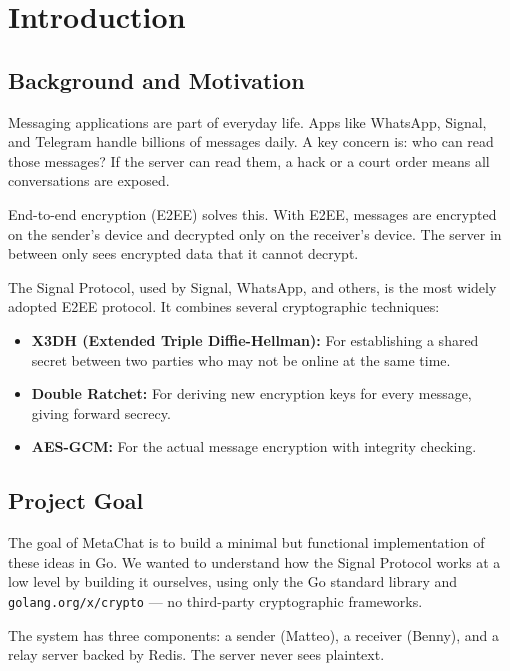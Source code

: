 \documentclass[12pt,a4paper]{article}
\begin{document}
\section{Introduction}

\subsection{Background and Motivation}

Messaging applications are part of everyday life. Apps like WhatsApp, Signal, and Telegram handle billions of messages daily. A key concern is: who can read those messages? If the server can read them, a hack or a court order means all conversations are exposed.

End-to-end encryption (E2EE) solves this. With E2EE, messages are encrypted on the sender's device and decrypted only on the receiver's device. The server in between only sees encrypted data that it cannot decrypt.

The Signal Protocol, used by Signal, WhatsApp, and others, is the most widely adopted E2EE protocol. It combines several cryptographic techniques:
\begin{itemize}
    \item \textbf{X3DH (Extended Triple Diffie-Hellman):} For establishing a shared secret between two parties who may not be online at the same time.
    \item \textbf{Double Ratchet:} For deriving new encryption keys for every message, giving forward secrecy.
    \item \textbf{AES-GCM:} For the actual message encryption with integrity checking.
\end{itemize}

\subsection{Project Goal}

The goal of MetaChat is to build a minimal but functional implementation of these ideas in Go. We wanted to understand how the Signal Protocol works at a low level by building it ourselves, using only the Go standard library and \texttt{golang.org/x/crypto} --- no third-party cryptographic frameworks.

The system has three components: a sender (Matteo), a receiver (Benny), and a relay server backed by Redis. The server never sees plaintext.
\end{document}

